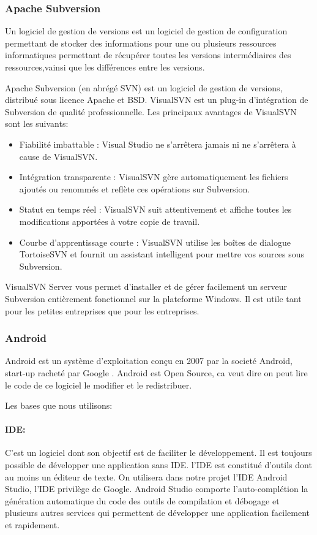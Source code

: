 \subsubsection{Apache Subversion}
Un logiciel de gestion de versions est un logiciel de gestion de configuration
permettant de stocker des informations pour une ou plusieurs ressources
informatiques permettant de récupérer toutes les versions intermédiaires des
ressources,vainsi que les différences entre les versions.

Apache Subversion (en abrégé SVN) est un logiciel de gestion de versions,
distribué sous licence Apache et BSD.
VisualSVN est un plug-in d’intégration de Subversion de qualité professionnelle.
Les principaux avantages de VisualSVN sont les suivants:

\begin{itemize}
    \item Fiabilité imbattable : Visual Studio ne s’arrêtera jamais ni ne
        s’arrêtera à cause de VisualSVN.
    \item Intégration transparente : VisualSVN gère automatiquement les fichiers
        ajoutés ou renommés et reflète ces opérations sur Subversion.
    \item Statut en temps réel : VisualSVN suit attentivement et affiche toutes
        les modifications apportées à votre copie de travail.
    \item Courbe d’apprentissage courte : VisualSVN utilise les boîtes de
        dialogue TortoiseSVN et fournit un assistant intelligent pour mettre
        vos sources sous Subversion.
\end{itemize}
VisualSVN Server vous permet d’installer et de gérer facilement un serveur
Subversion entièrement fonctionnel sur la plateforme Windows. Il est utile tant
pour les petites entreprises que pour les entreprises.

\subsubsection{Android}
Android est un système d'exploitation conçu en 2007 par la societé Android,
start-up racheté par Google . Android est Open Source, ca veut dire on peut lire
le code de ce logiciel le modifier et le redistribuer.

Les bases que nous utilisons:

\paragraph{IDE:}
C'est un logiciel dont son objectif est de faciliter le développement. Il est
toujours possible de développer une application sans IDE.
l'IDE est constitué d'outils dont au moins un éditeur de texte.
On utilisera dans notre projet l'IDE Android Studio, l'IDE privilège de Google.
Android Studio comporte l'auto-complétion la génération automatique  du code des
outils de compilation et débogage et plusieurs autres services qui permettent de
développer une application facilement et rapidement.

